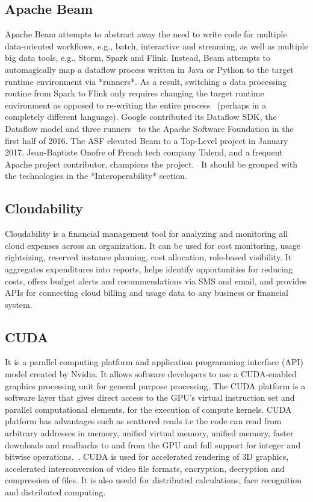 {\subsection{Apache Beam \cv}

Apache Beam attempts to abstract away the need to write code for
multiple data-oriented workflows, e.g., batch, interactive and
streaming, as well as multiple big data tools, e.g., Storm, Spark and
Flink.  Instead, Beam attempts to automagically map a dataflow process
written in Java or Python to the target runtime environment via
*runners*.  As a result, switching a data processing routine from
Spark to Flink only requires changing the target runtime environment
as opposed to re-writing the entire
process~\cite{www-infoworld-apachebeam} (perhaps in a completely
different language).  Google contributed its Dataflow SDK, the
Dataflow model and three runners~\cite{www-datanami-apachebeam} to the
Apache Software Foundation in the first half of 2016.  The ASF
elevated Beam to a Top-Level project in January 2017.  Jean-Baptiste
Onofre of French tech company Talend, and a frequent Apache project
contributor, champions the project.~\cite{www-talend-apachebeam} It
should be grouped with the technologies in the *Interoperability*
section.

\subsection{Cloudability \cv}

Cloudability is a financial management tool for analyzing and
monitoring all cloud expenses across an organization. It can be used
for cost monitoring, usage rightsizing, reserved instance planning,
cost allocation, role-based visibility. It aggregates expenditures
into reports, helps identify opportunities for reducing costs, offers
budget alerts and recommendations via SMS and email, and provides APIs
for connecting cloud billing and usage data to any business or
financial system.~\cite{www-cloudability}



\subsection{CUDA \cv}

It is a parallel computing platform and application programming
interface (API) model created by Nvidia. It allows software developers
to use a CUDA-enabled graphics processing unit for general purpose
processing. The CUDA platform is a software layer that gives direct
access to the GPU's virtual instruction set and parallel computational
elements, for the execution of compute kernels.  CUDA platform has
advantages such as scattered reads i.e the code can read from
arbitrary addresses in memory, unified virtual memory, unified memory,
faster downloads and readbacks to and from the GPU and full support
for integer and bitwise operations.~\cite{www-cuda-wikipedia}.  CUDA
is used for accelerated rendering of 3D graphics, accelerated
interconversion of video file formats, encryption, decryption and
compression of files.  It is also usedd for distributed calculations,
face recognition and distributed computing.~\cite{www-cuda-wikipedia}
	  

}
